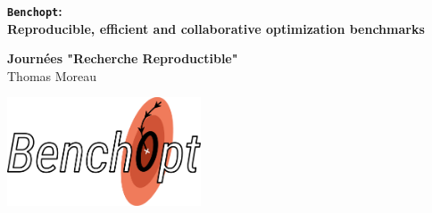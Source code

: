 \documentclass[unknownkeysallowed]{beamer}
\begin{document}


\begin{frame}
\bigskip
\bigskip
\begin{center}{
\LARGE\color{marron}
\textbf{\texttt{Benchopt}:\\
Reproducible, efficient and collaborative optimization benchmarks}
\textbf{ }\\
}

\color{marron}
\end{center}

\vspace{0.5cm}

\begin{center}
\textbf{Journées "Recherche Reproductible"} \\
\vspace{0.1cm}
Thomas Moreau\\
\end{center}

\centering
\includegraphics[width=0.43\textwidth]{sharedimages/benchopt_logo.pdf}

\end{frame}
\end{document}
